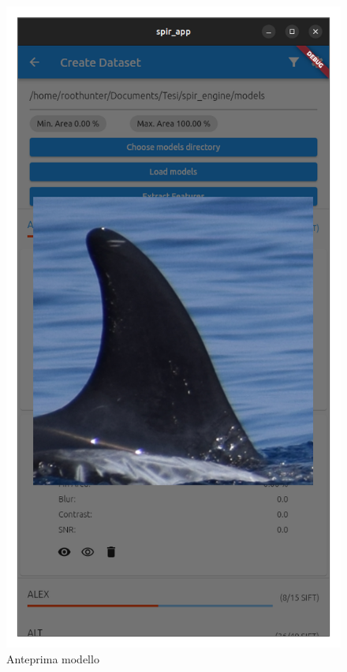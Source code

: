 \documentclass[a4paper,12pt]{report}
\begin{document}
\begin{figure}[H]
      \begin{minipage}{0.3\textwidth}
        \centering
        \includegraphics[width=\textwidth]{assets/images/methods/frontend/dataset_image.png}  
        \caption{Anteprima modello}
      \end{minipage}
      \begin{minipage}{0.3\textwidth}

\end{minipage}
\end{figure}
\end{document}
